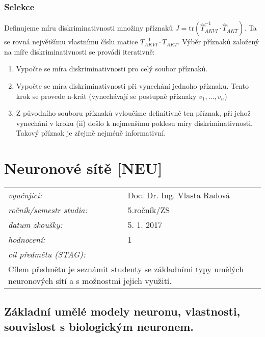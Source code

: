 \subsubsection*{Selekce}
Definujeme míru diskriminativnosti množiny příznaků $ J = \mathrm{tr}(\hat{T}_{AKVI}^{-1} \cdot \hat{T}_{AKT}) $. Ta se rovná největšímu vlastnímu číslu matice $ T_{AKVI}^{-1} \cdot T_{AKT} $. Výběr příznaků založený na míře diskriminativnosti se provádí iterativně:
\begin{enumerate}[label=(\roman*)]
\item Vypočte se míra diskriminativnosti pro celý soubor příznaků.
\item Vypočte se míra diskriminativnosti při vynechání jednoho příznaku. Tento krok se provede n-krát (vynechávají se postupně příznaky $ v_1, ..., v_n $)
\item Z původního souboru příznaků vyloučíme definitivně ten příznak, při jehož vynechání v kroku (ii) došlo k nejmenšímu poklesu míry diskriminativnosti. Takový příznak je zřejmě nejméně informativní.
\end{enumerate}
\vspace{2cm}

\section{Neuronové sítě [NEU]}

\begin{table}[H]
\centering
\begin{tabular}{p{4cm} p{12cm}}
\textit{vyučující:}             & Doc. Dr. Ing. Vlasta Radová \\
\textit{ročník/semestr studia:} & 5.ročník/ZS \\
\textit{datum zkoušky:}         & 5. 1. 2017 \\
\textit{hodnocení:}             & 1 \\
\textit{cíl předmětu (STAG):}   & \\
\multicolumn{2}{p{16cm}}{Cílem předmětu je seznámit studenty se základními typy umělých neuronových sítí a s možnostmi jejich využití.}
\end{tabular}
\end{table}

\subsection{Základní umělé modely neuronu, vlastnosti, souvislost s biologickým neuronem.}

